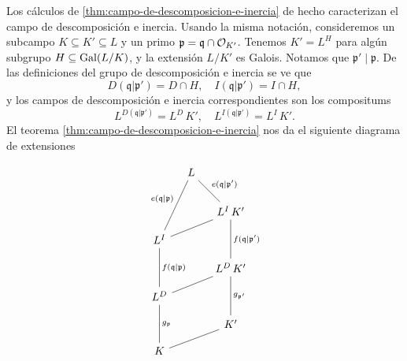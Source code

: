 Los cálculos de \ref{thm:campo-de-descomposicion-e-inercia} de hecho
caracterizan el campo de descomposición e inercia. Usando la misma notación,
consideremos un subcampo $K \subseteq K' \subseteq L$ y un primo
$\mathfrak{p} = \mathfrak{q} \cap \mathcal{O}_{K'}$. Tenemos $K' = L^H$ para algún
subgrupo $H \subseteq \operatorname{Gal} (L/K)$, y la extensión $L/K'$ es Galois.
Notamos que $\mathfrak{p}' \mid \mathfrak{p}$. De las definiciones del grupo
de descomposición e inercia se ve que
\[ D (\mathfrak{q}|\mathfrak{p}') = D\cap H, \quad
   I (\mathfrak{q}|\mathfrak{p}') = I\cap H, \]
y los campos de descomposición e inercia correspondientes son los compositums
\[ L^{D (\mathfrak{q}|\mathfrak{p}')} = L^D\,K', \quad
   L^{I (\mathfrak{q}|\mathfrak{p}')} = L^I\,K'. \]
El teorema \ref{thm:campo-de-descomposicion-e-inercia} nos da el siguiente
diagrama de extensiones

\[ \begin{tikzcd}[row sep=1em, column sep=1em]
  & L\ar[-]{dddl}[swap]{e (\mathfrak{q}|\mathfrak{p})}\ar[-]{ddr}{e (\mathfrak{q}|\mathfrak{p}')} \\
  \\
  & & L^I\,K'\ar[-]{dll}\ar[-]{dd}{f (\mathfrak{q}|\mathfrak{p}')} \\
  L^I\ar[-]{dd}{f (\mathfrak{q}|\mathfrak{p})} \\
  & & L^D\,K'\ar[-]{dll}\ar[-]{dd}{g_{\mathfrak{p}'}}\\
  L^D\ar[-]{dd}{g_\mathfrak{p}} \\
  & & K'\ar[-]{dll}\\
  K
\end{tikzcd} \]



